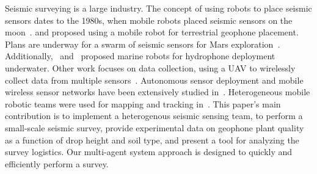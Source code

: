 Seismic surveying is a large industry.
The concept of using robots to place seismic sensors dates to the 1980s, when mobile robots placed seismic sensors on the moon~\cite{LSisMSE81}. \cite{DSSMaA14} and \cite{coste2013seismic} proposed using a mobile robot for terrestrial geophone placement. Plans are underway for a swarm of seismic sensors for Mars exploration~\cite{MAPL2006}.
Additionally,~\cite{muyzert2015marine} and~\cite{postel2014drone} proposed marine robots for hydrophone deployment underwater. 
Other work  focuses on data collection, using a UAV to wirelessly collect data from multiple sensors~\cite{wilcox2013seismic}. Autonomous sensor deployment and mobile wireless sensor networks have been extensively studied in~\cite{howard2002mobile,corke2004autonomous,tuna2014autonomous}. Heterogeneous mobile robotic teams were used for mapping and tracking in~\cite{howard2006experiments}.
This paper's main contribution is to implement a heterogenous seismic sensing team, to perform a small-scale seismic survey, provide experimental data on geophone plant quality as a function of drop height and soil type, and present a tool for analyzing the survey logistics.
Our multi-agent system approach is designed to quickly and efficiently perform a survey.


